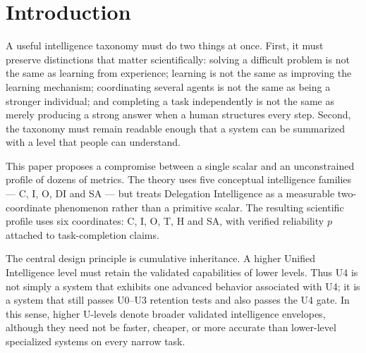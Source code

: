 \documentclass[11pt]{article}
\theoremstyle{definition}
\begin{document}
\begin{abstract}
\medskip
\noindent\textbf{Keywords:} unified intelligence, AGI levels, cognitive intelligence, individual intelligence, organizational intelligence, delegation intelligence, self-awareness, task difficulty, human intervention, harness architecture, recursive self-improvement, harness intelligence level, harness-LLM score, harnessability, benchmark ladder, harness scaling curve, long-term memory, episodic memory, semantic consolidation, procedural memory, benchmark validity, answer-key defects, cross-tier concordance, item saturation, graded scoring, memory capability, memory prerequisite gate, GUI perception, computer-use agents, spatial grounding, benchmark headroom, escalation, underdetermined tasks, sealed-mechanism discovery
\end{abstract}

\tableofcontents
\bigskip

\section{Introduction}

A useful intelligence taxonomy must do two things at once. First, it must preserve distinctions that matter scientifically: solving a difficult problem is not the same as learning from experience; learning is not the same as improving the learning mechanism; coordinating several agents is not the same as being a stronger individual; and completing a task independently is not the same as merely producing a strong answer when a human structures every step. Second, the taxonomy must remain readable enough that a system can be summarized with a level that people can understand.

This paper proposes a compromise between a single scalar and an unconstrained profile of dozens of metrics. The theory uses five conceptual intelligence families --- C, I, O, DI and SA --- but treats Delegation Intelligence as a measurable two-coordinate phenomenon rather than a primitive scalar. The resulting scientific profile uses six coordinates: C, I, O, T, H and SA, with verified reliability $p$ attached to task-completion claims.

The central design principle is cumulative inheritance. A higher Unified Intelligence level must retain the validated capabilities of lower levels. Thus U4 is not simply a system that exhibits one advanced behavior associated with U4; it is a system that still passes U0--U3 retention tests and also passes the U4 gate. In this sense, higher U-levels denote broader validated intelligence envelopes, although they need not be faster, cheaper, or more accurate than lower-level specialized systems on every narrow task.
\end{document}
